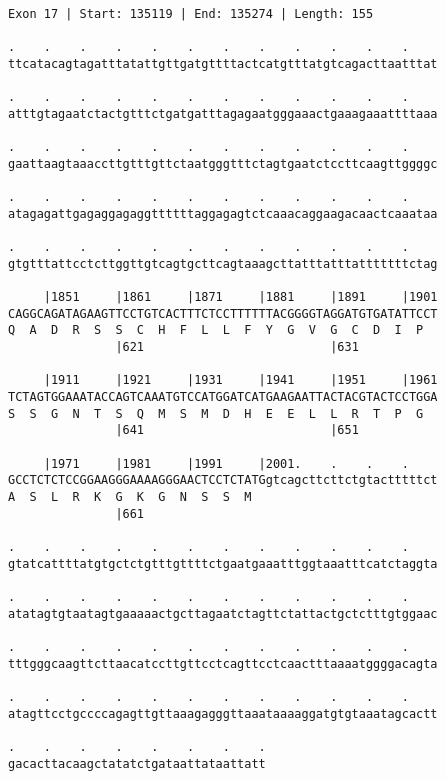 \documentclass{article}
\begin{document}
\begin{Verbatim}
Exon 17 | Start: 135119 | End: 135274 | Length: 155
 
.    .    .    .    .    .    .    .    .    .    .    .    
ttcatacagtagatttatattgttgatgttttactcatgtttatgtcagacttaatttat
  
.    .    .    .    .    .    .    .    .    .    .    .    
atttgtagaatctactgtttctgatgatttagagaatgggaaactgaaagaaattttaaa
  
.    .    .    .    .    .    .    .    .    .    .    .    
gaattaagtaaaccttgtttgttctaatgggtttctagtgaatctccttcaagttggggc
  
.    .    .    .    .    .    .    .    .    .    .    .    
atagagattgagaggagaggttttttaggagagtctcaaacaggaagacaactcaaataa
  
.    .    .    .    .    .    .    .    .    .    .    .    
gtgtttattcctcttggttgtcagtgcttcagtaaagcttatttatttatttttttctag
  
     |1851     |1861     |1871     |1881     |1891     |1901
CAGGCAGATAGAAGTTCCTGTCACTTTCTCCTTTTTTACGGGGTAGGATGTGATATTCCT
Q  A  D  R  S  S  C  H  F  L  L  F  Y  G  V  G  C  D  I  P  
               |621                          |631           
  
     |1911     |1921     |1931     |1941     |1951     |1961
TCTAGTGGAAATACCAGTCAAATGTCCATGGATCATGAAGAATTACTACGTACTCCTGGA
S  S  G  N  T  S  Q  M  S  M  D  H  E  E  L  L  R  T  P  G  
               |641                          |651           
  
     |1971     |1981     |1991     |2001.    .    .    .    
GCCTCTCTCCGGAAGGGAAAAGGGAACTCCTCTATGgtcagcttcttctgtactttttct
A  S  L  R  K  G  K  G  N  S  S  M                          
               |661                                         
  
.    .    .    .    .    .    .    .    .    .    .    .    
gtatcattttatgtgctctgtttgttttctgaatgaaatttggtaaatttcatctaggta
  
.    .    .    .    .    .    .    .    .    .    .    .    
atatagtgtaatagtgaaaaactgcttagaatctagttctattactgctctttgtggaac
  
.    .    .    .    .    .    .    .    .    .    .    .    
tttgggcaagttcttaacatccttgttcctcagttcctcaactttaaaatggggacagta
  
.    .    .    .    .    .    .    .    .    .    .    .    
atagttcctgccccagagttgttaaagagggttaaataaaaggatgtgtaaatagcactt
  
.    .    .    .    .    .    .    .
gacacttacaagctatatctgataattataattatt
\end{Verbatim}
\end{document}
